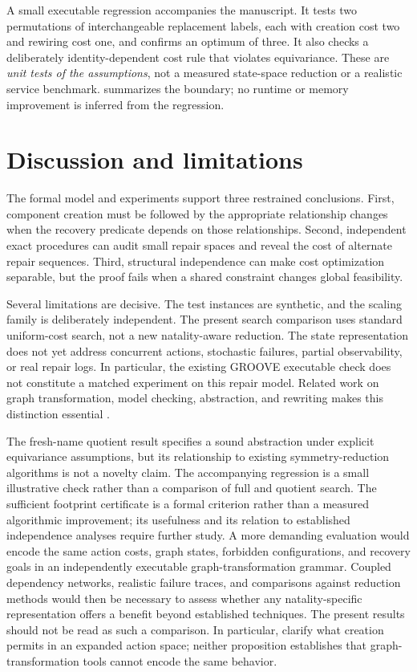 \documentclass[11pt,a4paper]{article}
\begin{document}
A small executable regression accompanies the manuscript. It tests two permutations of interchangeable replacement labels, each with creation cost two and rewiring cost one, and confirms an optimum of three. It also checks a deliberately identity-dependent cost rule that violates equivariance. These are \emph{unit tests of the assumptions}, not a measured state-space reduction or a realistic service benchmark.  summarizes the boundary; no runtime or memory improvement is inferred from the regression.

\section{Discussion and limitations}
The formal model and experiments support three restrained conclusions. First, component creation must be followed by the appropriate relationship changes when the recovery predicate depends on those relationships. Second, independent exact procedures can audit small repair spaces and reveal the cost of alternate repair sequences. Third, structural independence can make cost optimization separable, but the proof fails when a shared constraint changes global feasibility.

Several limitations are decisive. The test instances are synthetic, and the scaling family is deliberately independent. The present search comparison uses standard uniform-cost search, not a new natality-aware reduction. The state representation does not yet address concurrent actions, stochastic failures, partial observability, or real repair logs. In particular, the existing GROOVE executable check does not constitute a matched experiment on this repair model. Related work on graph transformation, model checking, abstraction, and rewriting makes this distinction essential \cite{Ghamarian2012,Emerson2005,Konig2025,Campbell2021,Adam2026,Ghasemi2026}.

The fresh-name quotient result specifies a sound abstraction under explicit equivariance assumptions, but its relationship to existing symmetry-reduction algorithms is not a novelty claim. The accompanying regression is a small illustrative check rather than a comparison of full and quotient search. The sufficient footprint certificate is a formal criterion rather than a measured algorithmic improvement; its usefulness and its relation to established independence analyses require further study. A more demanding evaluation would encode the same action costs, graph states, forbidden configurations, and recovery goals in an independently executable graph-transformation grammar. Coupled dependency networks, realistic failure traces, and comparisons against reduction methods would then be necessary to assess whether any natality-specific representation offers a benefit beyond established techniques. The present results should not be read as such a comparison. In particular,  clarify what creation permits in an expanded action space; neither proposition establishes that graph-transformation tools cannot encode the same behavior.
\end{document}
